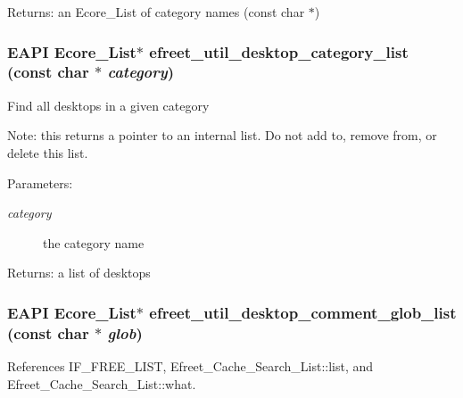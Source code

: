 \begin{Desc}
\item[Returns:]an Ecore\_\-List of category names (const char $\ast$) \end{Desc}
\subsubsection[efreet\_\-util\_\-desktop\_\-category\_\-list]{\setlength{\rightskip}{0pt plus 5cm}EAPI Ecore\_\-List$\ast$ efreet\_\-util\_\-desktop\_\-category\_\-list (const char $\ast$ {\em category})}\label{efreet__utils_8h_eea99e97fbede6cceccf6178fd7092e7}


Find all desktops in a given category

Note: this returns a pointer to an internal list. Do not add to, remove from, or delete this list.

\begin{Desc}
\item[Parameters:]
\begin{description}
\item[{\em category}]the category name \end{description}
\end{Desc}
\begin{Desc}
\item[Returns:]a list of desktops \end{Desc}
\subsubsection[efreet\_\-util\_\-desktop\_\-comment\_\-glob\_\-list]{\setlength{\rightskip}{0pt plus 5cm}EAPI Ecore\_\-List$\ast$ efreet\_\-util\_\-desktop\_\-comment\_\-glob\_\-list (const char $\ast$ {\em glob})}\label{efreet__utils_8h_e17d6c23f6e683fd97a60956f0724539}




References IF\_\-FREE\_\-LIST, Efreet\_\-Cache\_\-Search\_\-List::list, and Efreet\_\-Cache\_\-Search\_\-List::what.
